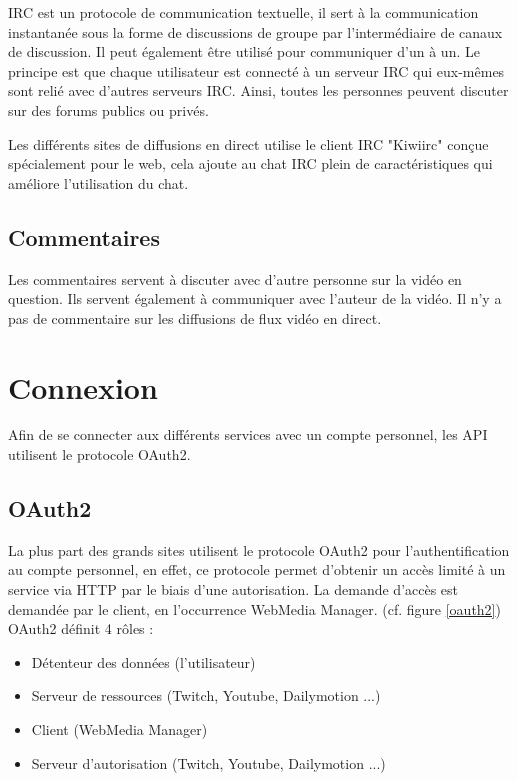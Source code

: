 \documentclass[11pt]{report} %
\begin{document}
		IRC est un protocole de communication textuelle, il sert à la communication instantanée sous la forme de discussions de groupe par l'intermédiaire de canaux de discussion. Il peut également être utilisé pour communiquer d'un à un.
		Le principe est que chaque utilisateur est connecté à un serveur IRC qui eux-mêmes sont relié avec d'autres serveurs IRC. Ainsi, toutes les personnes peuvent discuter sur des forums publics ou privés.
		
		Les différents sites de diffusions en direct utilise le client IRC "Kiwiirc" conçue spécialement pour le web, cela ajoute au chat IRC plein de caractéristiques qui améliore l'utilisation du chat.
		
		\subsection{Commentaires}
		Les commentaires servent à discuter avec d'autre personne sur la vidéo en question. Ils servent également à communiquer avec l'auteur de la vidéo.
		Il n'y a pas de commentaire sur les diffusions de flux vidéo en direct.
		
	\newpage
	\section{Connexion}
	Afin de se connecter aux différents services avec un compte personnel, les API utilisent le protocole OAuth2.
		\subsection{OAuth2}
		\label{sectionOauth2}
		La plus part des grands sites utilisent le protocole OAuth2 pour l'authentification au compte personnel, en effet, ce protocole permet d'obtenir un accès limité à un service via HTTP par le biais d'une autorisation. 
		La demande d'accès est demandée par le client, en l'occurrence WebMedia Manager.
		(cf. figure \ref{oauth2})\\
		OAuth2 définit 4 rôles :
		\begin{itemize}
			\item Détenteur des données (l'utilisateur)
			\item Serveur de ressources (Twitch, Youtube, Dailymotion ...)
			\item Client (WebMedia Manager)
			\item Serveur d'autorisation (Twitch, Youtube, Dailymotion ...)
		\end{itemize}
		
\end{document}
